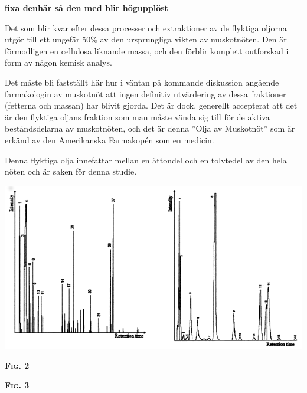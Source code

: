 \documentclass[a4paper,margin=3.25cm]{article}
\begin{document}
 \textbf{fixa denhär så den med blir högupplöst}

Det som blir kvar efter dessa processer och extraktioner av de flyktiga oljorna utgör till ett ungefär 50\% av den ursprungliga vikten av muskotnöten. Den är förmodligen en cellulosa liknande massa, och den förblir komplett outforskad i form av någon kemisk analys.

Det måste bli fastställt här hur i väntan på kommande diskussion angående farmakologin av muskotnöt att ingen definitiv utvärdering av dessa fraktioner (fetterna och massan) har blivit gjorda. Det är dock, generellt accepterat att det är den flyktiga oljans fraktion som man måste vända sig till för de aktiva beståndsdelarna av muskotnöten, och det är denna ''Olja av Muskotnöt'' som är erkänd av den Amerikanska Farmakopén som en medicin.

Denna flyktiga olja innefattar mellan en åttondel och en tolvtedel av den hela nöten och är saken för denna studie.

\hbox{\hspace{-0.1cm}\includegraphics[scale=0.75]{GCgraph}}

\begin{minipage}[t]{2cm}
\flushleft
\textsc{\textbf{Fig. 2}}
\end{minipage}
\hfill
\begin{minipage}[t]{2cm}
\flushright
\textsc{\textbf{Fig. 3}}
\end{minipage}
\end{document}
